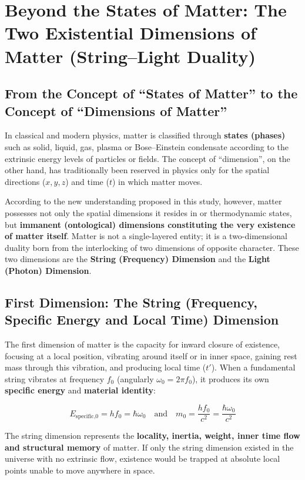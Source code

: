 \documentclass[12pt,a4paper]{article}
\begin{document}
\section{Beyond the States of Matter: The Two Existential Dimensions of Matter (String--Light Duality)}

\subsection{From the Concept of ``States of Matter'' to the Concept of ``Dimensions of Matter''}

In classical and modern physics, matter is classified through \textbf{states (phases)} such as solid, liquid, gas, plasma or Bose--Einstein condensate according to the extrinsic energy levels of particles or fields. The concept of ``dimension'', on the other hand, has traditionally been reserved in physics only for the spatial directions ($x, y, z$) and time ($t$) in which matter moves.

According to the new understanding proposed in this study, however, matter possesses not only the spatial dimensions it resides in or thermodynamic states, but \textbf{immanent (ontological) dimensions constituting the very existence of matter itself}. Matter is not a single-layered entity; it is a two-dimensional duality born from the interlocking of two dimensions of opposite character. These two dimensions are the \textbf{String (Frequency) Dimension} and the \textbf{Light (Photon) Dimension}.

\subsection{First Dimension: The String (Frequency, Specific Energy and Local Time) Dimension}

The first dimension of matter is the capacity for inward closure of existence, focusing at a local position, vibrating around itself or in inner space, gaining rest mass through this vibration, and producing local time ($t'$). When a fundamental string vibrates at frequency $f_0$ (angularly $\omega_0 = 2\pi f_0$), it produces its own \textbf{specific energy} and \textbf{material identity}:

\begin{equation}
E_{\text{specific,0}} = h f_0 = \hbar \omega_0 \quad \text{and} \quad m_0 = \frac{h f_0}{c^2} = \frac{\hbar \omega_0}{c^2}
\end{equation}

The string dimension represents the \textbf{locality, inertia, weight, inner time flow and structural memory} of matter. If only the string dimension existed in the universe with no extrinsic flow, existence would be trapped at absolute local points unable to move anywhere in space.
\end{document}
